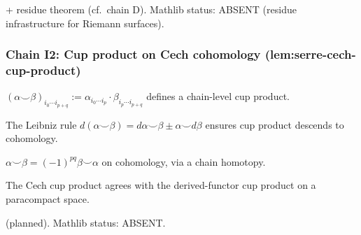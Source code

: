 \begin{lemma}
\label{lem:sti-r5}
 + residue theorem (cf.\ chain D).  Mathlib status: ABSENT (residue infrastructure for Riemann surfaces).
\leanok
\end{lemma}

\subsubsection*{Chain I2: Cup product on Cech cohomology (lem:serre-cech-cup-product)}

\begin{lemma}
\label{lem:scc-r1}
$(\alpha\smile\beta)_{i_{0}\cdots i_{p+q}} := \alpha_{i_{0}\cdots i_{p}}\cdot\beta_{i_{p}\cdots i_{p+q}}$ defines a chain-level cup product.
\leanok
\end{lemma}

\begin{lemma}
\label{lem:scc-r2}
The Leibniz rule $d(\alpha\smile\beta) = d\alpha\smile\beta\pm\alpha\smile d\beta$ ensures cup product descends to cohomology.
\leanok
\end{lemma}

\begin{lemma}
\label{lem:scc-r3}
$\alpha\smile\beta = (-1)^{pq}\beta\smile\alpha$ on cohomology, via a chain homotopy.
\leanok
\end{lemma}

\begin{lemma}
\label{lem:scc-r4}
The Cech cup product agrees with the derived-functor cup product on a paracompact space.
\leanok
\end{lemma}

\begin{lemma}
\label{lem:scc-r5}
 (planned).  Mathlib status: ABSENT.
\leanok
\end{lemma}

